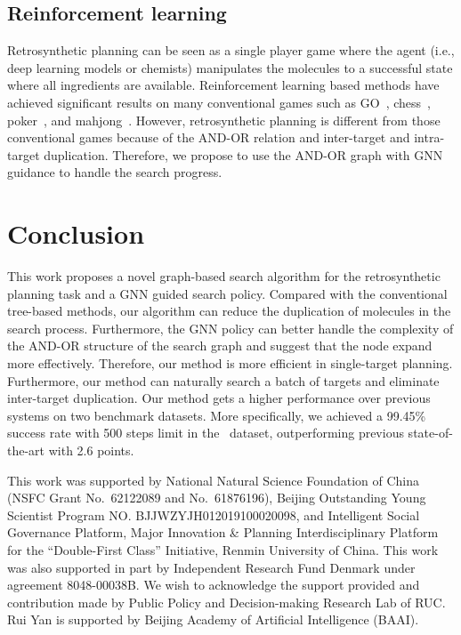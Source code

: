 \documentclass[sigconf]{acmart}
\begin{document}
\subsection{Reinforcement learning}
Retrosynthetic planning can be seen as a single player game where the agent (i.e., deep learning models or chemists) manipulates the molecules to a successful state where all ingredients are available.
Reinforcement learning based methods have achieved significant results on many conventional games such as GO~\citep{silver2017mastering,alphazero}, chess~\citep{alphazero}, poker~\citep{poker2019}, and mahjong~\citep{li2020suphx}.
However, retrosynthetic planning is different from those conventional games because of the AND-OR relation and inter-target and intra-target duplication.
Therefore, we propose to use the AND-OR graph with GNN guidance to handle the search progress.



\section{Conclusion}
This work proposes a novel graph-based search algorithm for the retrosynthetic planning task and a GNN guided search policy. Compared with the conventional tree-based methods, our algorithm can reduce the duplication of molecules in the search process. Furthermore, the GNN policy can better handle the complexity of the AND-OR structure of the search graph and suggest that the node expand more effectively. Therefore, our method is more efficient in single-target planning. Furthermore, our method can naturally search a batch of targets and eliminate inter-target duplication. Our method gets a higher performance over previous systems on two benchmark datasets. More specifically, we achieved a 99.45\% success rate with 500 steps limit in the \uspto~dataset, outperforming previous state-of-the-art with 2.6 points.

\begin{acks}
This work was supported by National Natural Science Foundation of China (NSFC Grant No.~62122089 and No.~61876196), Beijing Outstanding Young Scientist Program NO. BJJWZYJH012019100020098, and Intelligent Social Governance Platform, Major Innovation \& Planning Interdisciplinary Platform for the ``Double-First Class'' Initiative, Renmin University of China.
This work was also supported in part by Independent Research Fund Denmark under agreement  8048-00038B.
We wish to acknowledge the support provided and contribution made by Public Policy and Decision-making Research Lab of RUC.
Rui Yan is supported by Beijing Academy of Artificial Intelligence (BAAI).
\end{acks}


\end{document}
